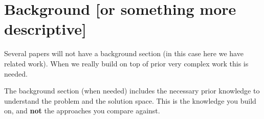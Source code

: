 \section{Background [or something more descriptive]} \label{sec:related}

Several papers will not have a background section (in this case here we have
related work). When we really build on top of prior very complex work this is
needed.

The background section (when needed) includes the necessary prior knowledge to
understand the problem and the solution space. This is the knowledge you build
on, and \textbf{not} the approaches you compare against.
